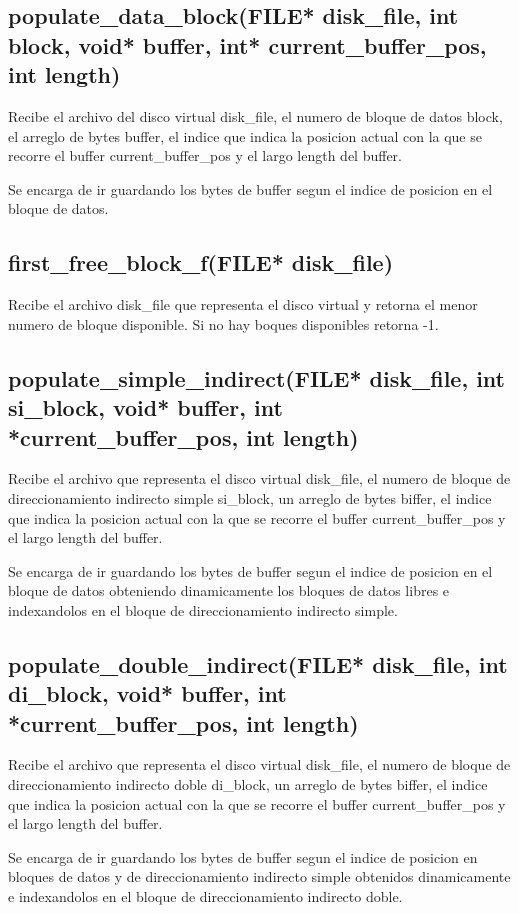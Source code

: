 \documentclass[12pt]{article}
\begin{document}
\subsection{populate\_data\_block(FILE* disk\_file, int block, 
  void* buffer, int* current\_buffer\_pos, int length) }
Recibe el archivo del disco virtual disk\_file, el numero de bloque de datos block, el arreglo de bytes buffer, el indice que indica la posicion actual con la que se recorre el buffer current\_buffer\_pos y el largo length del buffer.

Se encarga de ir guardando los bytes de buffer segun el indice de posicion en el bloque de datos.

\subsection{first\_free\_block\_f(FILE* disk\_file)}
Recibe el archivo disk\_file que representa el disco virtual y retorna el menor numero de bloque disponible. Si no hay boques disponibles retorna -1.

\subsection{populate\_simple\_indirect(FILE* disk\_file, int si\_block, void* buffer, int *current\_buffer\_pos, int length)}
Recibe el archivo que representa el disco virtual disk\_file, el numero de bloque de direccionamiento indirecto simple si\_block, un arreglo de bytes biffer, el indice que indica la posicion actual con la que se recorre el buffer current\_buffer\_pos y el largo length del buffer.

Se encarga de ir guardando los bytes de buffer segun el indice de posicion en el bloque de datos obteniendo dinamicamente los bloques de datos libres e indexandolos en el bloque de direccionamiento indirecto simple.


\subsection{populate\_double\_indirect(FILE* disk\_file, int di\_block, void* buffer, int *current\_buffer\_pos, int length)}
Recibe el archivo que representa el disco virtual disk\_file, el numero de bloque de direccionamiento indirecto doble di\_block, un arreglo de bytes biffer, el indice que indica la posicion actual con la que se recorre el buffer current\_buffer\_pos y el largo length del buffer.

Se encarga de ir guardando los bytes de buffer segun el indice de posicion en bloques de datos y de direccionamiento indirecto simple obtenidos dinamicamente e indexandolos en el bloque de direccionamiento indirecto doble.
\end{document}
